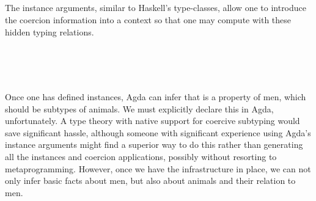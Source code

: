 \begin{code}
\AgdaSpace{}%
\AgdaSymbol{\{\{}\AgdaSymbol{\}\}}\AgdaSpace{}%
\AgdaSpace{}%
\AgdaSymbol{=}\AgdaSpace{}%
\AgdaSpace{}%
\AgdaSymbol{(}\AgdaSpace{}%
\AgdaSpace{}%
\AgdaSymbol{)}\<%
\\
%
\\[\AgdaEmptyExtraSkip]%
\>[0]\<%
\\
\>[0][@{}l@{\AgdaIndent{0}}]%
\>[2]\AgdaSpace{}%
\AgdaSymbol{:}\AgdaSpace{}%
\AgdaSpace{}%
\AgdaSpace{}%
\<%
\\
%
\>[2]\AgdaSpace{}%
\AgdaSymbol{:}\AgdaSpace{}%
\AgdaSpace{}%
\AgdaSpace{}%
\<%
\end{code}

The instance arguments, similar to Haskell's type-classes, allow one to
introduce the coercion information into a context so that one may compute with
these hidden typing relations.

\begin{code}%
\>[0]\<%
\\
\>[0][@{}l@{\AgdaIndent{0}}]%
\>[2]\AgdaSpace{}%
\AgdaSymbol{=}\AgdaSpace{}%
\AgdaSpace{}%
\AgdaSpace{}%
\<%
\\
%
\>[2]\AgdaSpace{}%
\AgdaSymbol{=}\AgdaSpace{}%
\AgdaSpace{}%
\AgdaSpace{}%
\<%
\\
%
\>[2]\AgdaSpace{}%
\AgdaSymbol{=}\AgdaSpace{}%
\AgdaSpace{}%
\AgdaSpace{}%
\<%
\end{code}

Once one has defined instances, Agda can infer that  is a property of
men, which should be subtypes of animals. We must explicitly declare this in
Agda, unfortunately. A type theory with native support for coercive subtyping
would save significant hassle, although someone with significant experience
using Agda's instance arguments might find a superior way to do this rather than
generating all the instances and coercion applications, possibly without
resorting to metaprogramming. However, once we have the infrastructure in place,
we can not only infer basic facts about men, but also about animals and their
relation to men.

